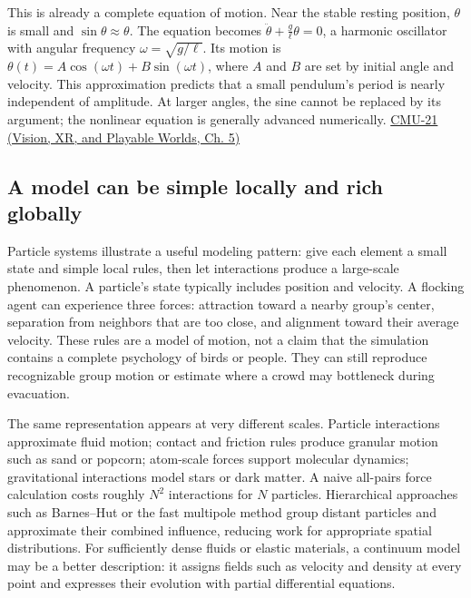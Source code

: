 This is already a complete equation of motion. Near the stable resting position, \(\theta\) is small and \(\sin\theta\approx\theta\). The equation becomes \(\ddot\theta+\frac{g}{\ell}\theta=0\), a harmonic oscillator with angular frequency \(\omega=\sqrt{g/\ell}\). Its motion is \(\theta(t)=A\cos(\omega t)+B\sin(\omega t)\), where \(A\) and \(B\) are set by initial angle and velocity. This approximation predicts that a small pendulum's period is nearly independent of amplitude. At larger angles, the sine cannot be replaced by its argument; the nonlinear equation is generally advanced numerically. \href{../07-Vision-XR-and-Playable-Worlds/main.pdf\#nameddest=04-visual-computing-ii-ch036-cmu-21---dynamics-and-time-integration}{CMU-21 (Vision, XR, and Playable Worlds, Ch. 5)}

\subsection{A model can be simple locally and rich globally}\label{04-visual-computing-ii-ch029-a-model-can-be-simple-locally-and-rich-globally}

Particle systems illustrate a useful modeling pattern: give each element a small state and simple local rules, then let interactions produce a large-scale phenomenon. A particle's state typically includes position and velocity. A flocking agent can experience three forces: attraction toward a nearby group's center, separation from neighbors that are too close, and alignment toward their average velocity. These rules are a model of motion, not a claim that the simulation contains a complete psychology of birds or people. They can still reproduce recognizable group motion or estimate where a crowd may bottleneck during evacuation.

The same representation appears at very different scales. Particle interactions approximate fluid motion; contact and friction rules produce granular motion such as sand or popcorn; atom-scale forces support molecular dynamics; gravitational interactions model stars or dark matter. A naive all-pairs force calculation costs roughly \(N^2\) interactions for \(N\) particles. Hierarchical approaches such as Barnes--Hut or the fast multipole method group distant particles and approximate their combined influence, reducing work for appropriate spatial distributions. For sufficiently dense fluids or elastic materials, a continuum model may be a better description: it assigns fields such as velocity and density at every point and expresses their evolution with partial differential equations.

